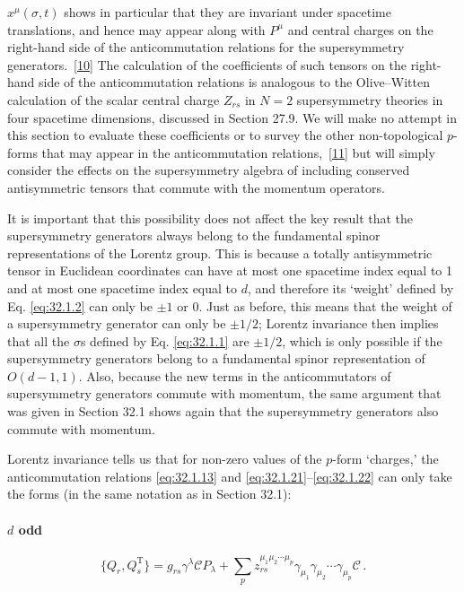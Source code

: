 \(x^\mu(\sigma,t)\) shows in particular that they are invariant under
spacetime translations, and hence may appear along with \(P^\mu\) and
central charges on the right-hand side of the anticommutation relations
for the supersymmetry generators.~\hyperref[ch32-ref-10]{[10]} The
calculation of the coefficients of such tensors on the right-hand side of
the anticommutation relations is analogous to the Olive--Witten
calculation of the scalar central charge \(Z_{rs}\) in \(N=2\)
supersymmetry theories in four spacetime dimensions, discussed in Section
27.9. We will make no attempt in this section to evaluate these
coefficients or to survey the other non-topological \(p\)-forms that may
appear in the anticommutation relations,~\hyperref[ch32-ref-11]{[11]} but
will simply consider the effects on the supersymmetry algebra of including
conserved antisymmetric tensors that commute with the momentum operators.

It is important that this possibility does not affect the key result that
the supersymmetry generators always belong to the fundamental spinor
representations of the Lorentz group. This is because a totally
antisymmetric tensor in Euclidean coordinates can have at most one
spacetime index equal to 1 and at most one spacetime index equal to \(d\),
and therefore its `weight' defined by Eq. \eqref{eq:32.1.2} can only be
\(\pm1\) or 0. Just as before, this means that the weight of a
supersymmetry generator can only be \(\pm1/2\); Lorentz invariance then
implies that all the \(\sigma\)s defined by Eq. \eqref{eq:32.1.1} are
\(\pm1/2\), which is only possible if the supersymmetry generators belong
to a fundamental spinor representation of \(O(d-1,1)\). Also, because the
new terms in the anticommutators of supersymmetry generators commute with
momentum, the same argument that was given in Section 32.1 shows again
that the supersymmetry generators also commute with momentum.

Lorentz invariance tells us that for non-zero values of the \(p\)-form
`charges,' the anticommutation relations \eqref{eq:32.1.13} and
\eqref{eq:32.1.21}--\eqref{eq:32.1.22} can only take the forms (in the
same notation as in Section 32.1):

\paragraph{\(d\) odd}
\begin{equation}
  \{Q_r,Q_s^{\mathrm T}\}
  =g_{rs}\gamma^\lambda\mathcal C P_\lambda
   +\sum_p z_{rs}^{\mu_1\mu_2\cdots\mu_p}
    \gamma_{\mu_1}\gamma_{\mu_2}\cdots\gamma_{\mu_p}\mathcal C\,.
  \tag{32.3.2}\label{eq:32.3.2}
\end{equation}

